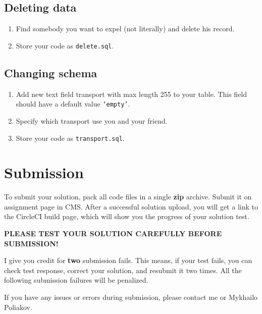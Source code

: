 \documentclass[12pt]{article}
\newcommand{\code}[1]{\texttt{#1}}
\begin{document}
\subsection*{Deleting data}

\begin{enumerate}

\item Find somebody you want to expel (not literally) and delete his record.

\item Store your code as \code{delete.sql}.

\end{enumerate}

\subsection*{Changing schema}

\begin{enumerate}

\item Add new text field transport with max length 255 to your table. This field should have a default value \code{'empty'}.

\item Specify which transport use you and your friend.

\item Store your code as \code{transport.sql}.

\end{enumerate}

\section*{Submission}

To submit your solution, pack all code files in a single \textbf{zip} archive. Submit it on assignment page in CMS. After a successful solution upload, you will get a link to the CircleCI build page, which will show you the progress of your solution test.

\uppercase{\textbf{Please test your solution carefully before submission!}}

I give you credit for \textbf{two} submission fails. This means, if your test fails, you can check test response, correct your solution, and resubmit it two times. All the following submission failures will be penalized.

If you have any issues or errors during submission, please contact me or Mykhailo Poliakov.
\end{document}
